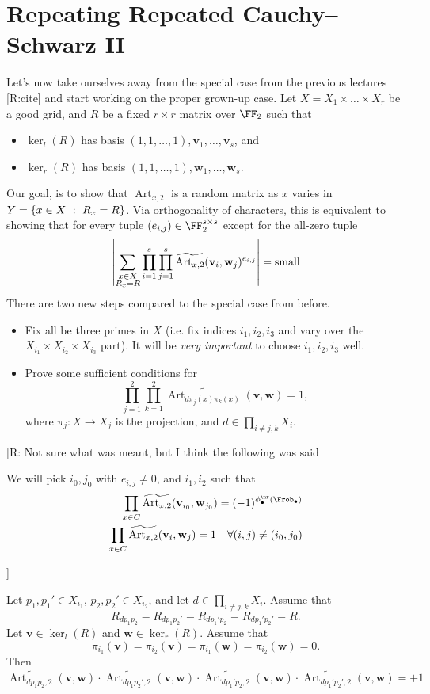 \documentclass{lecturenotes}
\newcommand{\ross}[1]{{\color{red}[R:#1]}}
\newcommand{\Art}{\operatorname{Art}}
\newcommand{\bv}{\mathbf{v}}
\newcommand{\bw}{\mathbf{w}}
\newcommand{\kerl}{\ker_{l}}
\newcommand{\kerr}{\ker_{r}}
\numberwithin{equation}{section}
\begin{document}
\section{Repeating Repeated Cauchy--Schwarz II}
Let's now take ourselves away from the special case from the previous lectures \ross{cite} and start working on the proper grown-up case.  Let $X=X_1\times\dots\times X_r$ be a good grid, and $R$ be a fixed $r\times r$ matrix over $\FF_2$ such that
\begin{itemize}
    \item $\kerl(R)$ has basis $(1,1,\dots,1),\bv_1,\dots,\bv_s$, and
    \item $\kerr(R)$ has basis $(1,1,\dots,1),\bw_1,\dots,\bw_s$.
\end{itemize}
Our goal, is to show that $\Art_{x,2}$ is a random matrix as $x$ varies in $Y=\left\{{x\in X~:~R_x=R}\right\}$.  Via orthogonality of characters, this is equivalent to showing that for every tuple $(e_{i,j})\in \FF_2^{s\times s}$ except for the all-zero tuple
\[\abs{\sum_{\substack{x\in X\\R_x=R}}\prod_{i=1}^s\prod_{j=1}^s\widetilde{\Art_{x,2}}(\bv_i,\bw_j)^{e_{i,j}}}=\textnormal{small}\]
There are two new steps compared to the special case from before.
\begin{itemize}
    \item Fix all be three primes in $X$ (i.e. fix indices $i_1,i_2,i_3$ and vary over the $X_{i_1}\times X_{i_2}\times X_{i_3}$ part).  It will be \emph{very important} to choose $i_1,i_2,i_3$ well.
    \item Prove some sufficient conditions for 
    \[\prod_{j=1}^2\prod_{k=1}^2\widetilde{\Art_{d\pi_{j}(x)\pi_{k}(x)}}(\bv,\bw)=1,\]
    where $\pi_j:X\to X_j$ is the projection, and $d\in \prod_{i\neq j,k}X_i$.
\end{itemize}
\ross{ Not sure what was meant, but I think the following was said
\begin{rem}
    We will pick $i_0,j_0$ with $e_{i,j}\neq 0$, and $i_1,i_2$ such that 
    \begin{align*}
        \prod_{x\in C}\widetilde{\Art_{x,2}}(\bv_{i_0},\bw_{j_0})=(-1)^{\phi_{\bullet}^\nr(\Frob_\bullet)}\\
        \prod_{x\in C}\widetilde{\Art_{x,2}}(\bv_{i},\bw_{j})=1\quad\forall (i,j)\neq (i_0,j_0)
    \end{align*}
\end{rem}}
\begin{theorem}
    Let $p_1,p_1'\in X_{i_1}$, $p_2,p_2'\in X_{i_2}$, and let $d\in \prod_{i\neq j,k}X_i$.  Assume that 
    \[R_{dp_1p_2}=R_{dp_1p_2'}=R_{dp_1'p_2}=R_{dp_1'p_2'}=R.\]
    Let $\bv\in \kerl(R)$ and $\bw\in \kerr(R)$.  Assume that
    \[\pi_{i_1}(\bv)=\pi_{i_2}(\bv)=\pi_{i_1}(\bw)=\pi_{i_2}(\bw)=0.\]
    Then
    \[\widetilde{\Art_{dp_1p_2,2}}(\bv,\bw)\cdot\widetilde{\Art_{dp_1p_2',2}}(\bv,\bw)\cdot\widetilde{\Art_{dp_1'p_2,2}}(\bv,\bw)\cdot\widetilde{\Art_{dp_1'p_2',2}}(\bv,\bw)=+1\]
\end{theorem}
\end{document}
